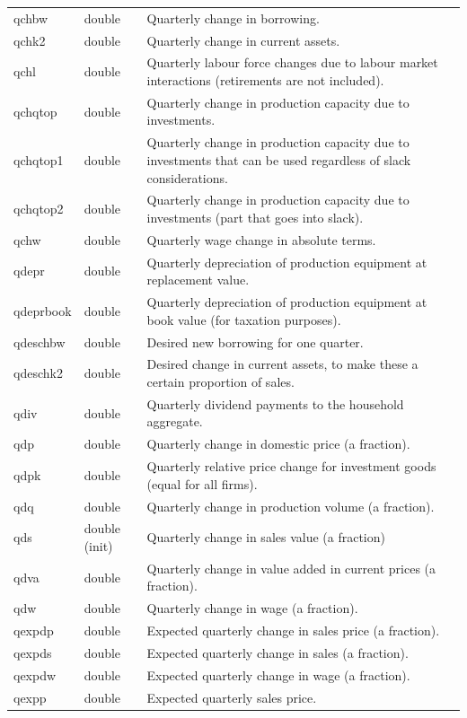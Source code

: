 \documentclass{article}
\begin{document}
\begin{longtable}{p{}p{}p{}}
qchbw & double & Quarterly change in borrowing.\\
qchk2 & double & Quarterly change in current assets.\\
qchl & double & Quarterly labour force changes due to labour market interactions (retirements are not included).\\
qchqtop & double & Quarterly change in production capacity due to investments.\\
qchqtop1 & double & Quarterly change in production capacity due to investments that can be used regardless of slack considerations.\\
qchqtop2 & double & Quarterly change in production capacity due to investments (part that goes into slack).\\
qchw & double & Quarterly wage change in absolute terms.\\
qdepr & double & Quarterly depreciation of production equipment at replacement value.\\
qdeprbook & double & Quarterly depreciation of production equipment at book value (for taxation purposes).\\
qdeschbw & double & Desired new borrowing for one quarter.\\
qdeschk2 & double & Desired change in current assets, to make these a certain proportion of sales.\\
qdiv & double & Quarterly dividend payments to the household aggregate.\\
qdp & double & Quarterly change in domestic price (a fraction).\\
qdpk & double & Quarterly relative price change for investment goods (equal for all firms).\\
qdq & double & Quarterly change in production volume (a fraction).\\
qds & double (init) & Quarterly change in sales value (a fraction)\\
qdva & double & Quarterly change in value added in current prices (a fraction).\\
qdw & double & Quarterly change in wage (a fraction).\\
qexpdp & double & Expected quarterly change in sales price (a fraction).\\
qexpds & double & Expected quarterly change in sales (a fraction).\\
qexpdw & double & Expected quarterly change in wage (a fraction).\\
qexpp & double & Expected quarterly sales price.\\

\end{longtable}
\end{document}

